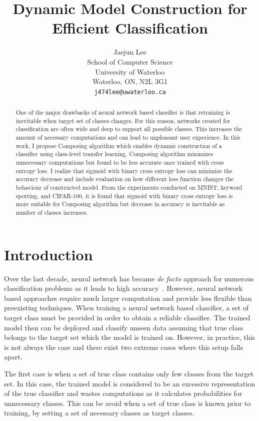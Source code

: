 \documentclass{article}
\title{Dynamic Model Construction for Efficient Classification}
\author{
    Jaejun Lee \\
    School of Computer Science\\
    University of Waterloo\\
    Waterloo, ON, N2L 3G1 \\
    \texttt{j474lee@uwaterloo.ca} \\
}
\begin{document}
\maketitle

\begin{abstract}

One of the major drawbacks of neural network based classifier is that retraining is inevitable when target set of classes changes. For this reason, networks created for classification are often wide and deep to support all possible classes. This increases the amount of necessary computations and can lead to unpleasant user experience. In this work, I propose Composing algorithm which enables dynamic construction of a classifier using class-level transfer learning. Composing algorithm minimizes unnecessary computations but found to be less accurate once trained with cross entropy loss. I realize that sigmoid with binary cross entropy loss can minimize the accuracy decrease and include evaluation on how different loss function changes the behaviour of constructed model. From the experiments conducted on MNIST, keyword spotting, and CIFAR-100, it is found that sigmoid with binary cross entropy loss is more suitable for Composing algorithm but decrease in accuracy is inevitable as number of classes increases.

\end{abstract}

\section{Introduction}

Over the last decade, neural network has became {\it de facto} approach for numerous classification problems as it leads to high accuracy~\cite{lecun1998gradient, chen2014small, krizhevsky2009learning}. However, neural network based approaches require much larger computation and provide less flexible than preexisting techniques. When training a neural network based classifier, a set of target class must be provided in order to obtain a reliable classifier. The trained model then can be deployed and classify unseen data assuming that true class belongs to the target set which the model is trained on. However, in practice, this is not always the case and there exist two extreme cases where this setup falls apart.

The first case is when a set of true class contains only few classes from the target set. In this case, the trained model is considered to be an excessive representation of the true classifier and wastes computations as it calculates probabilities for unnecessary classes. This can be avoid when a set of true class is known prior to training, by setting a set of necessary classes as target classes.
\end{document}
